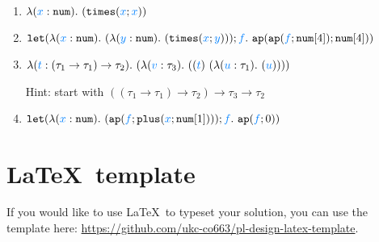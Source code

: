 \documentclass[11pt,landscape]{article}
\begin{document}



% 
\begin{enumerate}
\item $\clam{\enum{}}{x}{\etimes{\var{x}}{\var{x}}}$
\item { $\elet{\clam{\enum{}}{x}{
        \clam{\enum{}}{y}{
          \etimes{\var x}{\var y}
        }
      }
    }{f}{
      \eapp
      {\eapp
        {\var{f}}
        {\enum{4}}
      }
      {\enum{4}}
    }
    $}

\item $\clam{(\tau_1 \rightarrow \tau_1) \rightarrow \tau_2}{t}{
    \clam{\tau_3}{v}{
      \capp{\var{t}}{\clam{\tau_1}{u}{\var u}}
    }
  }$

  Hint: start with $((\tau_1 \rightarrow \tau_1) \rightarrow \tau_2) \rightarrow \tau_3 \rightarrow \tau_2$


\item $\elet{\clam{\enum{}}{x}{
      \eapp{\var f}{\eplus{\var{x}}{\enum{1}}}
    }
  }{f}{
    \eapp{\var{f}}{0}
  }$ 
\end{enumerate}

\section*{\LaTeX\ template}

If you would like to use \LaTeX\ to typeset your solution, you can use
the template here:
\url{https://github.com/ukc-co663/pl-design-latex-template}.
\end{document}

